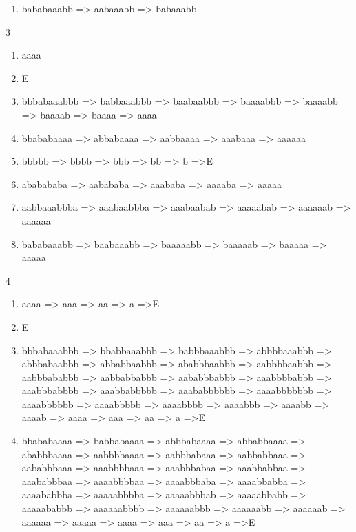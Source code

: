 \documentclass{article}
\begin{document}
\begin{enumerate}
\begin{enumerate}
\item bababaaabb => aabaaabb => babaaabb

\end{enumerate}



3

\begin{enumerate}
\item aaaa

\item E

\item bbbabaaabbb => babbaaabbb => baabaabbb => baaaabbb => baaaabb => baaaab => baaaa => aaaa

\item bbababaaaa => abbabaaaa => aabbaaaa => aaabaaa => aaaaaa

\item bbbbb => bbbb => bbb => bb => b =>E

\item ababababa => aabababa => aaababa => aaaaba => aaaaa

\item aabbaaabbba => aaabaabbba => aaabaabab => aaaaabab => aaaaaab => aaaaaa

\item bababaaabb => baabaaabb => baaaaabb => baaaaab => baaaaa => aaaaa

\end{enumerate}

4

\begin{enumerate}
\item aaaa => aaa => aa => a =>E

\item E

\item bbbabaaabbb => bbabbaaabbb => babbbaaabbb => abbbbaaabbb => abbbabaabbb => abbabbaabbb => ababbbaabbb => aabbbbaabbb => aabbbababbb => aabbabbabbb => aababbbabbb => aaabbbbabbb => aaabbbabbbb => aaabbabbbbb => aaababbbbbb => aaaabbbbbbb => aaaabbbbbb => aaaabbbbb => aaaabbbb => aaaabbb => aaaabb => aaaab => aaaa => aaa => aa => a =>E

\item bbababaaaa => babbabaaaa => abbbabaaaa => abbabbaaaa => ababbbaaaa => aabbbbaaaa => aabbbabaaa => aabbabbaaa => aababbbaaa => aaabbbbaaa => aaabbbabaa => aaabbabbaa => aaababbbaa => aaaabbbbaa => aaaabbbaba => aaaabbabba => aaaababbba => aaaaabbbba => aaaaabbbab => aaaaabbabb => aaaaababbb => aaaaaabbbb => aaaaaabbb => aaaaaabb => aaaaaab => aaaaaa => aaaaa => aaaa => aaa => aa => a =>E


\end{enumerate}
\end{enumerate}
\end{document}
